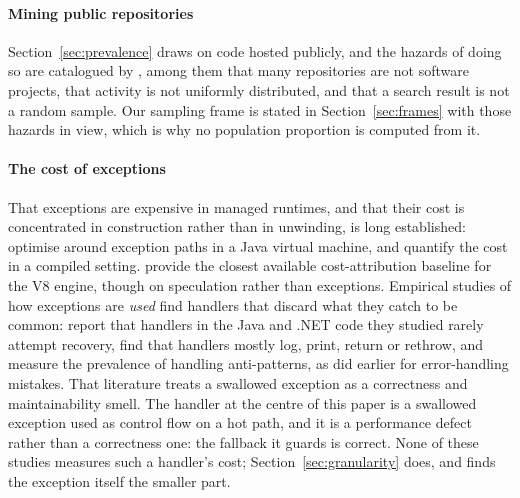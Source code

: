 \documentclass[preprint,12pt,authoryear]{elsarticle}
\begin{document}
\paragraph{Mining public repositories} Section~\ref{sec:prevalence} draws on
code hosted publicly, and the hazards of doing so are catalogued by
\citet{kalliamvakou2014promises}, among them that many
repositories are not software projects, that activity is not uniformly
distributed, and that a search result is not a random sample. Our sampling
frame is stated in Section~\ref{sec:frames} with those hazards in view, which
is why no population proportion is computed from it.

\paragraph{The cost of exceptions} That exceptions are expensive in managed
runtimes, and that their cost is concentrated in construction rather than in
unwinding, is long established: \citet{ogasawara2006edo}
optimise around exception paths in a Java virtual machine, and \citet{renwick2019lowcost} quantify the cost in a compiled setting.
\citet{parravicini2021cost} provide the closest
available cost-attribution baseline for the V8 engine, though on speculation
rather than exceptions. Empirical studies of how exceptions are \emph{used}
find handlers that discard what they catch to be common: \citet{cabral2007exception} report that handlers in the Java and .NET
code they studied rarely attempt recovery, \citet{kery2016examining} find that handlers mostly log, print, return or
rethrow, and \citet{depadua2017prevalence} measure the
prevalence of handling anti-patterns, as \citet{weimer2004finding} did earlier for error-handling mistakes. That
literature treats a swallowed exception as a correctness and maintainability
smell. The handler at the centre of this paper is a swallowed exception used as
control flow on a hot path, and it is a performance defect rather than a
correctness one: the fallback it guards is correct. None of these studies
measures such a handler's cost; Section~\ref{sec:granularity} does, and finds
the exception itself the smaller part.
\end{document}
